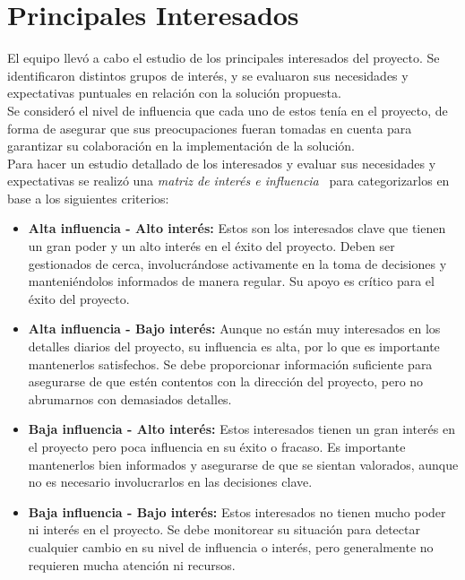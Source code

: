 \section{Principales Interesados}\label{sec:pricipalesInteresados}

El equipo llevó a cabo el estudio de los principales interesados del proyecto. Se identificaron distintos grupos de interés, 
y se evaluaron sus necesidades y expectativas puntuales en relación con la solución propuesta.\\
Se consideró el nivel de influencia que cada uno de estos tenía en el proyecto, de forma de asegurar que sus preocupaciones fueran 
tomadas en cuenta para garantizar su colaboración en la implementación de la solución.\\
Para hacer un estudio detallado de los interesados y evaluar sus necesidades y expectativas se realizó una \textit{matriz de interés e influencia}~\cite{projectmanagement_stakeholder_analysis} 
para categorizarlos en base a los siguientes criterios:


\begin{itemize}
    \item \textbf{Alta influencia -  Alto interés:} Estos son los interesados clave que tienen un gran poder y un alto interés en el 
    éxito del proyecto. Deben ser gestionados de cerca, involucrándose activamente en la toma de decisiones y manteniéndolos informados 
    de manera regular. Su apoyo es crítico para el éxito del proyecto.
    \item \textbf{Alta influencia - Bajo interés:} Aunque no están muy interesados en los detalles diarios del proyecto, su influencia es 
    alta, por lo que es importante mantenerlos satisfechos. Se debe proporcionar información suficiente para asegurarse de que estén 
    contentos con la dirección del proyecto, pero no abrumarnos con demasiados detalles.
    \item \textbf{Baja influencia - Alto interés:} Estos interesados tienen un gran interés en el proyecto pero poca influencia en su éxito 
    o fracaso. Es importante mantenerlos bien informados y asegurarse de que se sientan valorados, aunque no es necesario involucrarlos en 
    las decisiones clave.
    \item \textbf{Baja influencia - Bajo interés:} Estos interesados no tienen mucho poder ni interés en el proyecto. Se debe monitorear su 
    situación para detectar cualquier cambio en su nivel de influencia o interés, pero generalmente no requieren mucha atención ni recursos.
\end{itemize}

